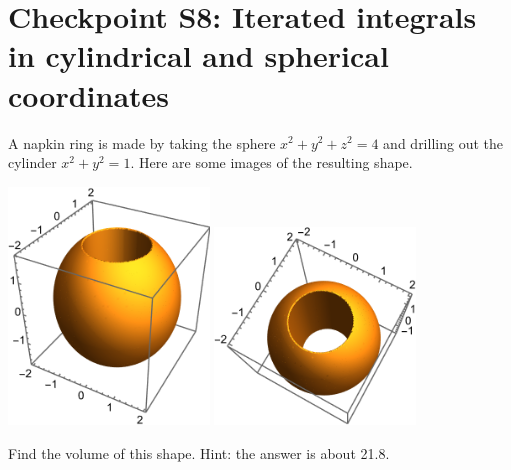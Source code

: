 


%


\allowdisplaybreaks
\section{Checkpoint S8: Iterated integrals in cylindrical and spherical coordinates}
A napkin ring is made by taking the sphere $x^2 + y^2 + z^2 = 4$ and drilling out the cylinder $x^2 + y^2 = 1$. Here are some images of the resulting shape.

\begin{center}
    \includegraphics[width=0.4\textwidth]{../images/napkin-ring-1.png}
    \includegraphics[width=0.4\textwidth]{../images/napkin-ring-2.png}
\end{center}
	
Find the volume of this shape. Hint: the answer is about 21.8.

